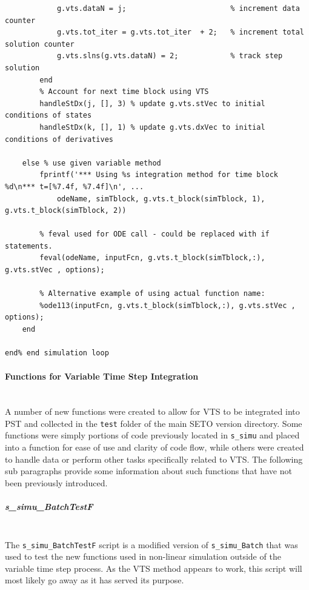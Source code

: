 \documentclass[12pt]{article}
\begin{document}
\begin{verbatim}
            g.vts.dataN = j;                        % increment data counter
            g.vts.tot_iter = g.vts.tot_iter  + 2;   % increment total solution counter
            g.vts.slns(g.vts.dataN) = 2;            % track step solution
        end
        % Account for next time block using VTS
        handleStDx(j, [], 3) % update g.vts.stVec to initial conditions of states
        handleStDx(k, [], 1) % update g.vts.dxVec to initial conditions of derivatives 
        
    else % use given variable method
        fprintf('*** Using %s integration method for time block %d\n*** t=[%7.4f, %7.4f]\n', ...
            odeName, simTblock, g.vts.t_block(simTblock, 1), g.vts.t_block(simTblock, 2))
        
        % feval used for ODE call - could be replaced with if statements.
        feval(odeName, inputFcn, g.vts.t_block(simTblock,:), g.vts.stVec , options);
        
        % Alternative example of using actual function name:
        %ode113(inputFcn, g.vts.t_block(simTblock,:), g.vts.stVec , options);
    end
    
end% end simulation loop
\end{verbatim}

\pagebreak
\paragraph{Functions for Variable Time Step Integration} \ \\
A number of new functions were created to allow for VTS to be integrated into PST and collected in the \verb|test| folder of the main SETO version directory.
Some functions were simply portions of code previously located in \verb|s_simu| and placed into a function for ease of use and clarity of code flow, while others were created to handle data or perform other tasks specifically related to VTS.
The following sub paragraphs provide some information about such functions that have not been previously introduced.



\subparagraph{s\_simu\_BatchTestF} \ \\
The \verb|s_simu_BatchTestF| script is a modified version of \verb|s_simu_Batch| that was used to test the new functions used in non-linear simulation outside of the variable time step process.
As the VTS method appears to work, this script will most likely go away as it has served its purpose.
\end{document}
